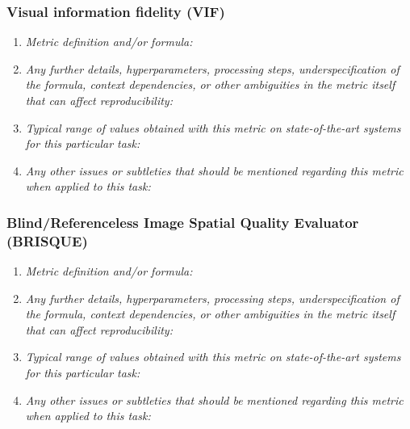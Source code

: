 \documentclass[a4paper,11pt]{article}
\begin{document}
        \subsubsection{Visual information fidelity (VIF)}
            \begin{enumerate}[label=\alph*.]
                \item \textit{Metric definition and/or formula:}
                \bigskip
                \item \textit{Any further details, hyperparameters, processing steps, underspecification of the formula, context dependencies, or other ambiguities in the metric itself that can affect reproducibility:}
                \bigskip
                \item \textit{Typical range of values obtained with this metric on state-of-the-art systems for this particular task:}
                \bigskip
                \item \textit{Any other issues or subtleties that should be mentioned regarding this metric when applied to this task:}
                \bigskip
            \end{enumerate}
        \subsubsection{Blind/Referenceless Image Spatial Quality Evaluator (BRISQUE)}
            \begin{enumerate}[label=\alph*.]
                \item \textit{Metric definition and/or formula:}
                \bigskip
                \item \textit{Any further details, hyperparameters, processing steps, underspecification of the formula, context dependencies, or other ambiguities in the metric itself that can affect reproducibility:}
                \bigskip
                \item \textit{Typical range of values obtained with this metric on state-of-the-art systems for this particular task:}
                \bigskip
                \item \textit{Any other issues or subtleties that should be mentioned regarding this metric when applied to this task:}
                \bigskip
            \end{enumerate}
\end{document}
